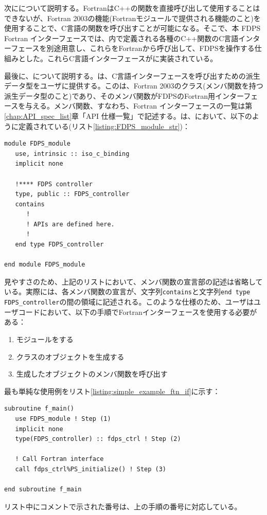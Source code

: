 次にについて説明する。FortranはC++の関数を直接呼び出して使用することはできないが、Fortran 2003の機能(Fortranモジュールで提供される機能のこと)を使用することで、C言語の関数を呼び出すことが可能になる。そこで、本 FDPS Fortran インターフェースでは、内で定義される各種のC++関数のC言語インターフェースを別途用意し、これらをFortranから呼び出して、FDPSを操作する仕組みとした。これらC言語インターフェースがに実装されている。

最後に、について説明する。は、C言語インターフェースを呼び出すための派生データ型をユーザに提供する。このは、Fortran 2003のクラス(メンバ関数を持つ派生データ型のこと)であり、そのメンバ関数がFDPSのFortran用インターフェースを与える。メンバ関数、すなわち、Fortran インターフェースの一覧は第\ref{chap:API_spec_list}章「API 仕様一覧」で記述する。は、において、以下のように定義されている(リスト\ref{listing:FDPS_module_str})：
\begin{lstlisting}[caption=\texttt{FDPS\_module.F90}の構造,label=listing:FDPS_module_str]
module FDPS_module
   use, intrinsic :: iso_c_binding
   implicit none
   
   !**** FDPS controller
   type, public :: FDPS_controller
   contains
      !
      ! APIs are defined here.
      !
   end type FDPS_controller
   
end module FDPS_module  
\end{lstlisting}
見やすさのため、上記のリストにおいて、メンバ関数の宣言部の記述は省略している。実際には、各メンバ関数の宣言が、文字列\verb|contains|と文字列\verb|end type FDPS_controller|の間の領域に記述される。このような仕様のため、ユーザはユーザコードにおいて、以下の手順でFortranインターフェースを使用する必要がある：
\begin{enumerate}[leftmargin=*,itemsep=-1ex,label=(\arabic*)]
\item モジュールをする
\item クラスのオブジェクトを生成する
\item 生成したオブジェクトのメンバ関数を呼び出す
\end{enumerate}
最も単純な使用例をリスト\ref{listing:simple_example_ftn_if}に示す：
\begin{lstlisting}[caption=Fortranインターフェースの使用例,label=listing:simple_example_ftn_if]
subroutine f_main()
   use FDPS_module ! Step (1)
   implicit none
   type(FDPS_controller) :: fdps_ctrl ! Step (2)
   
   ! Call Fortran interface
   call fdps_ctrl%PS_initialize() ! Step (3)
   
end subroutine f_main
\end{lstlisting}
リスト中にコメントで示された番号は、上の手順の番号に対応している。

